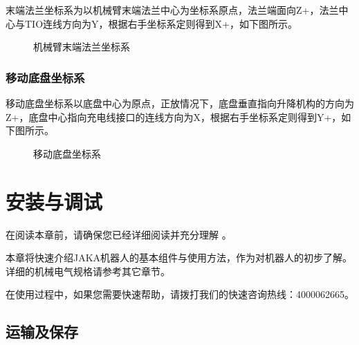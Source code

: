 \documentclass[a4paper,11pt,english,openany,oneside]{sphinxmanual}
\begin{document}
\sphinxAtStartPar
末端法兰坐标系为以机械臂末端法兰中心为坐标系原点，法兰端面向Z+，法兰中心与TIO连线方向为Y\sphinxhyphen{}，根据右手坐标系定则得到X+，如下图所示。

\begin{figure}[H]
\centering
\capstart

\noindent{}
\caption{机械臂末端法兰坐标系}\label{\detokenize{07 _u6280_u672f_u89c4_u683c:id94}}\end{figure}




\subsection{移动底盘坐标系}
\label{\detokenize{07 _u6280_u672f_u89c4_u683c:id55}}\label{\detokenize{07 _u6280_u672f_u89c4_u683c:id56}}
\sphinxAtStartPar
移动底盘坐标系以底盘中心为原点，正放情况下，底盘垂直指向升降机构的方向为Z+，底盘中心指向充电线接口的连线方向为X\sphinxhyphen{}，根据右手坐标系定则得到Y+，如下图所示。

\begin{figure}[H]
\centering
\capstart

\noindent{}
\caption{移动底盘坐标系}\label{\detokenize{07 _u6280_u672f_u89c4_u683c:id95}}\end{figure}



\sphinxstepscope


\chapter{安装与调试}
\label{\detokenize{08 _u5b89_u88c5_u4e0e_u8c03_u8bd5:id1}}\label{\detokenize{08 _u5b89_u88c5_u4e0e_u8c03_u8bd5:id2}}\label{\detokenize{08 _u5b89_u88c5_u4e0e_u8c03_u8bd5::doc}}
\sphinxAtStartPar
在阅读本章前，请确保您已经详细阅读并充分理解 {\hyperref[\detokenize{05 _u5b89_u5168_u89c4_u8303:id1}]{}} 。

\sphinxAtStartPar
本章将快速介绍JAKA机器人的基本组件与使用方法，作为对机器人的初步了解。详细的机械电气规格请参考其它章节。

\sphinxAtStartPar
在使用过程中，如果您需要快速帮助，请拨打我们的快速咨询热线：400\sphinxhyphen{}006\sphinxhyphen{}2665。


\section{运输及保存}
\label{\detokenize{08 _u5b89_u88c5_u4e0e_u8c03_u8bd5:id3}}\label{\detokenize{08 _u5b89_u88c5_u4e0e_u8c03_u8bd5:id4}}
\end{document}

